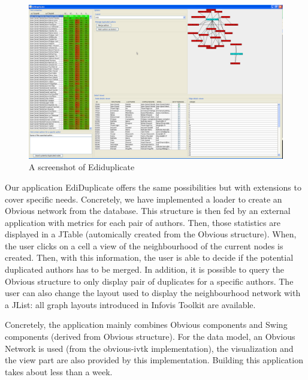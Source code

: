 \begin{figure}[!h]
\includegraphics[width=\columnwidth]{figures/ediduplicate}
\caption{A screenshot of Ediduplicate}
\label{fig:ediduplicate}
\end{figure}

Our application EdiDuplicate offers the same possibilities but with extensions to cover specific needs. Concretely, we have implemented a loader to create an Obvious network from the  database. This structure is then fed by an external application with metrics for each pair of authors. Then, those statistics are displayed in a JTable (automically created from the Obvious structure). When, the user clicks on a cell a view of the neighbourhood of the current nodes is created. Then, with this information, the user is able to decide if the potential duplicated authors has to be merged. In addition, it is possible to query the Obvious structure to only display pair of duplicates for a specific authors. The user can also change the layout used to display the neighbourhood network with a JList: all graph layouts introduced in Infovis Toolkit are available. 

Concretely, the application mainly combines Obvious components and Swing components (derived from Obvious structure). For the data model, an Obvious Network is used (from the obvious-ivtk implementation), the visualization and the view part are also provided by this implementation. Building this application takes about less than a week.
